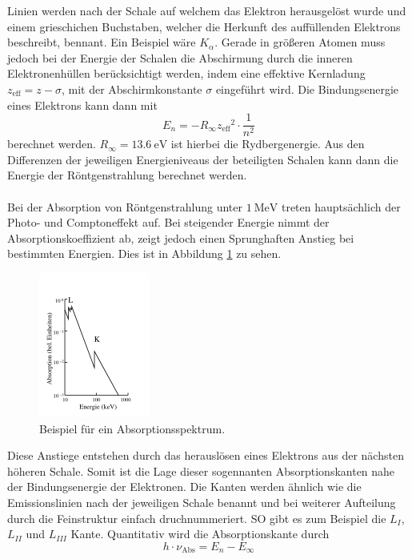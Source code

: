 Linien werden nach der Schale auf welchem das Elektron herausgelöst wurde und einem grieschichen Buchstaben, welcher die Herkunft des auffüllenden Elektrons beschreibt, bennant.
Ein Beispiel wäre $K_{\alpha}$. Gerade in größeren Atomen muss jedoch bei der Energie der Schalen die Abschirmung durch die inneren Elektronenhüllen berücksichtigt werden, indem
eine effektive Kernladung $z_\text{eff}= z - \sigma$, mit der Abschirmkonstante $\sigma$ eingeführt wird. Die Bindungsenergie eines Elektrons kann dann mit
\begin{equation}
  E_n = - R_{\infty} {z_\text{eff}}^2 \cdot \frac{1}{n^2}
  \label{eqn:En}
\end{equation}
berechnet werden. $R_{\infty} = \SI{13.6}{\electronvolt}$ ist hierbei die Rydbergenergie. Aus den Differenzen der jeweiligen Energieniveaus der beteiligten Schalen kann dann die
Energie der Röntgenstrahlung berechnet werden. \\\\
Bei der Absorption von Röntgenstrahlung unter $\SI{1}{\mega\electronvolt}$ treten hauptsächlich der Photo- und Comptoneffekt auf. Bei steigender Energie nimmt der Absorptionskoeffizient
ab, zeigt jedoch einen Sprunghaften Anstieg bei bestimmten Energien. Dies ist in Abbildung \ref{fig:absorption} zu sehen.
\begin{figure}
  \centering
  \includegraphics{images/absorption.png}
  \caption{Beispiel für ein Absorptionsspektrum.\cite{sample}}
  \label{fig:absorption}
\end{figure}
Diese Anstiege entstehen durch das herauslösen eines Elektrons aus der nächsten höheren Schale.
Somit ist die Lage dieser sogennanten Absorptionskanten nahe der Bindungsenergie der Elektronen. Die Kanten werden ähnlich wie die Emissionslinien nach der jeweiligen Schale
benannt und bei weiterer Aufteilung durch die Feinstruktur einfach druchnummeriert. SO gibt es zum Beispiel die $L_I$, $L_{II}$ und $L_{III}$ Kante. Quantitativ wird
die Absorptionskante durch
\begin{equation}
  h \cdot {\nu}_\text{Abs} = E_n - E_{\infty}
  \label{eqn:kante}
\end{equation}
